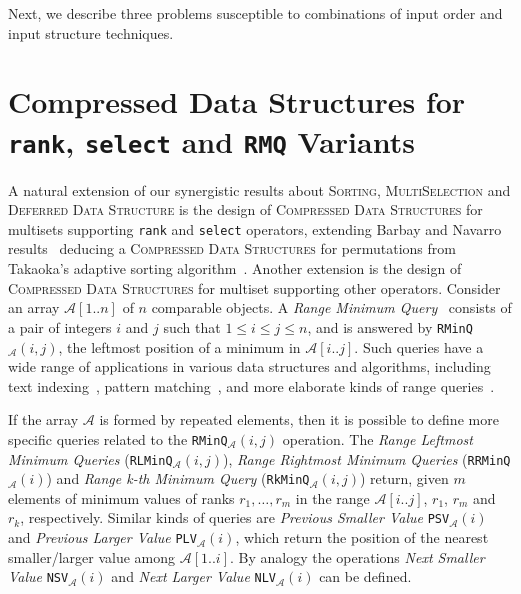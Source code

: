 Next, we describe three problems susceptible to combinations of input
order and input structure techniques.

\section{Compressed Data Structures for \texttt{rank}, \texttt{select}
  and \texttt{RMQ} Variants}
\label{sec:compressed}

A natural extension of our synergistic results about \textsc{Sorting},
\textsc{MultiSelection} and \textsc{Deferred Data Structure} is the
design of \textsc{Compressed Data Structures} for multisets supporting
\texttt{rank} and \texttt{select} operators, extending Barbay and
Navarro
results~\cite{2013-TCS-OnCompressingPermutationsAndAdaptiveSorting-BarbayNavarro}
deducing a \textsc{Compressed Data Structures} for permutations from
Takaoka's adaptive sorting
algorithm~\cite{2009-Chapter-PartialSolutionAndEntropy-Takaoka}.
Another extension is the design of \textsc{Compressed Data Structures}
for multiset supporting other operators. Consider an array
${\mathcal{A}}[1..n]$ of $n$ comparable objects. A \emph{Range Minimum
  Query}~\cite{1993-SICOMP-RecursiveStarTreeParallelDataStructure-BerkmanVishkin}
consists of a pair of integers $i$ and $j$ such that
$1\le i\le j\le n$, and is answered by
\texttt{RMinQ}$_{\mathcal{A}}(i,j)$, the leftmost position of a
minimum in $\mathcal{A}[i..j]$. Such queries have a wide range of
applications in various data structures and algorithms, including text
indexing~\cite{2009-TCS-FasterEntropyBoundedCompressedSuffixTrees-FischerMakinenNavarro},
pattern
matching~\cite{2008-STACS-ImprovedAlgorithmsForTheRangeNextValueProblemAndApplications-CrochemoreIliopoulosKubicaRahmanWalen},
and more elaborate kinds of range
queries~\cite{2004-ISAAC-OnTheRangeMaximumSumSegmentQueryProblem-ChenChao}.


If the array $\mathcal{A}$ is formed by repeated elements, then it is possible
to define more specific queries related to the
\texttt{RMinQ}$_{\mathcal{A}}(i,j)$ operation. The \emph{Range
  Leftmost Minimum Queries} (\texttt{RLMinQ}$_{\mathcal{A}}(i,j)$),
\emph{Range Rightmost Minimum Queries}
(\texttt{RRMinQ}$_{\mathcal{A}}(i)$) and \emph{Range k-th Minimum
  Query} (\texttt{RkMinQ}$_{\mathcal{A}}(i,j)$) return, given $m$
elements of minimum values of ranks $r_1, \dots, r_m$ in the range
${\mathcal{A}}[i..j]$, $r_1$, $r_m$ and $r_k$, respectively.
Similar kinds of queries are \emph{Previous Smaller Value}
\texttt{PSV}$_{\mathcal{A}}(i)$ and \emph{Previous Larger Value}
\texttt{PLV}$_{\mathcal{A}}(i)$, which return the position of the nearest
smaller/larger value among ${\mathcal{A}}[1..i]$. By analogy the operations
\emph{Next Smaller Value} \texttt{NSV}$_{\mathcal{A}}(i)$ and \emph{Next Larger Value}
\texttt{NLV}$_{\mathcal{A}}(i)$ can be defined.

